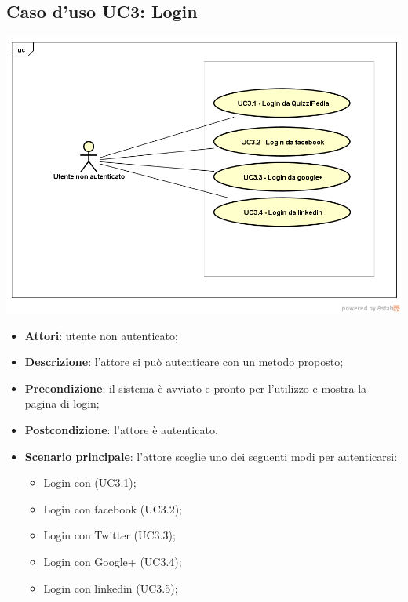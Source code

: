 \subsection{Caso d'uso UC3: Login}
\begin{center}
	\includegraphics[scale=0.5]{UML/UC3.png}
\end{center}
\begin{itemize}
	\item \textbf{Attori}: utente non autenticato;
	\item \textbf{Descrizione}: l'attore si può autenticare con un metodo proposto;
	\item \textbf{Precondizione}: il sistema è avviato e pronto per l'utilizzo e mostra la pagina di login;
	\item \textbf{Postcondizione}: l'attore è autenticato.
	\item \textbf{Scenario principale}: l'attore sceglie uno dei seguenti modi per autenticarsi:
		\begin{itemize}
			\item Login con \progetto (UC3.1);
			\item Login con facebook (UC3.2);
			\item Login con Twitter (UC3.3);
			\item Login con Google+ (UC3.4);
			\item Login con linkedin (UC3.5);
		\end{itemize}
\end{itemize}

